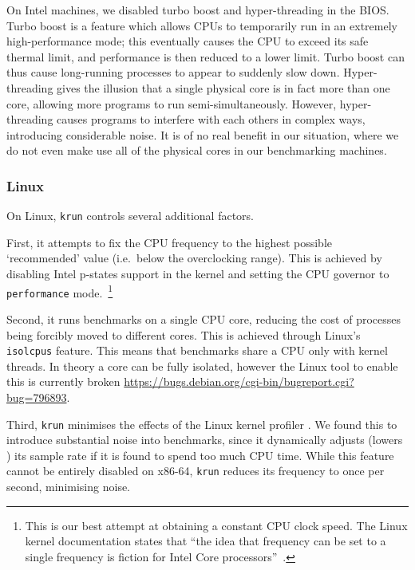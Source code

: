 \documentclass[10pt,preprint]{sigplanconf}
\newcommand{\krun}{\texttt{krun}\xspace}
\begin{document}
On Intel machines, we disabled turbo boost and hyper-threading in the BIOS. Turbo boost is a
feature which allows CPUs to temporarily run in an extremely high-performance
mode; this eventually causes the CPU to exceed its safe thermal limit, and
performance is then reduced to a lower limit. Turbo boost can thus cause long-running processes to
appear to suddenly slow down. Hyper-threading gives the illusion that a single
physical core is in fact more than one core, allowing more programs to
run semi-simultaneously. However, hyper-threading causes programs to interfere
with each others in complex ways, introducing considerable noise. It is of
no real benefit in our situation, where we do not even make use all of the
physical cores in our benchmarking machines.


\subsubsection{Linux}

On Linux, \krun controls several additional factors.

First, it attempts to fix the CPU frequency to the highest
possible `recommended' value (i.e.~below the overclocking range). This is achieved by disabling Intel
p-states support in the kernel and setting the CPU governor to \texttt{performance}
mode.~\footnote{This is our best attempt at obtaining a constant CPU clock
speed. The Linux kernel documentation states that ``the idea that frequency can
be set to a single frequency is fiction for Intel Core
processors''~\cite{XXX}.}

Second, it runs benchmarks on a single CPU core, reducing the cost of processes
being forcibly moved to different cores. This is achieved through Linux's
\texttt{isolcpus} feature.  This means that benchmarks
share a CPU only with kernel threads. In theory a core can be fully isolated,
however the Linux tool to enable this is currently broken
\url{https://bugs.debian.org/cgi-bin/bugreport.cgi?bug=796893}.

Third, \krun minimises the effects of the Linux kernel profiler . We found this to introduce
substantial noise into benchmarks, since it dynamically adjusts (lowers
) its sample rate if it is found
to spend too much CPU time. While this feature cannot be entirely disabled on
x86-64, \krun reduces its frequency to once per second, minimising noise.
\end{document}
